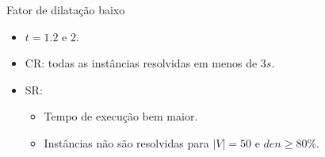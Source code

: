 \documentclass[dvipsnames]{beamer}
\begin{document}
\begin{frame}{Fator de dilatação baixo}
  \begin{itemize}
    \item $t = \num{1,2}$ e $2$.
    \item CR: todas as instâncias resolvidas em menos de $3s$.
    \item SR:
      \begin{itemize}
      \item Tempo de execução bem maior.
        \item Instâncias não são resolvidas para $|V| = 50$ e $den \ge 80\%$.
        \end{itemize}
  \end{itemize}

\begin{figure}%
    \centering
    \label{fig:tree_sf1_1_sf2_s50_aleat}%
\end{figure}  
  \end{frame}
\end{document}
